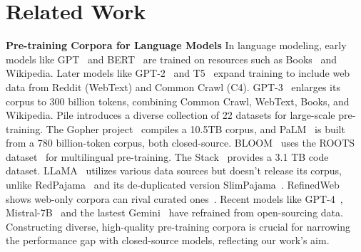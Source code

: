 \section{Related Work}

\noindent\textbf{Pre-training Corpora for Language Models} \quad In language modeling, early models like GPT~\citep{radford2018improving} and BERT~\citep{devlin-etal-2019-bert} are trained on resources such as Books~\citep{DBLP:conf/iccv/ZhuKZSUTF15-Books} and Wikipedia. Later models like GPT-2~\citep{radford2019gpt-2} and T5~\citep{DBLP:journals/jmlr/RaffelSRLNMZLL20-T5} expand training to include web data from Reddit (WebText) and Common Crawl (C4). GPT-3~\citep{DBLP:conf/nips/BrownMRSKDNSSAA20-gpt-3} enlarges its corpus to 300 billion tokens, combining Common Crawl, WebText, Books, and Wikipedia. Pile \citep{DBLP:journals/corr/abs-2101-00027-pile} introduces a diverse collection of 22 datasets for large-scale pre-training. The Gopher project~\citep{DBLP:journals/corr/abs-2112-11446-gopher} compiles a 10.5TB corpus, and PaLM~\citep{DBLP:journals/jmlr/ChowdheryNDBMRBCSGSSTMRBTSPRDHPBAI23-palm} is built from a 780 billion-token corpus, both closed-source. BLOOM~\citep{DBLP:journals/corr/abs-2211-05100-bloom} uses the ROOTS dataset~\citep{DBLP:conf/nips/LaurenconSWAMSW22-roots} for multilingual pre-training. The Stack~\citet{DBLP:journals/corr/abs-2211-15533-stack} provides a 3.1 TB code dataset. LLaMA~\citep{DBLP:journals/corr/abs-2302-13971-llama} utilizes various data sources but doesn't release its corpus, unlike RedPajama~\citep{RedPajama} and its de-duplicated version SlimPajama~\citep{SlimPajama}. RefinedWeb shows web-only corpora can rival curated ones~\citep{DBLP:journals/corr/abs-2306-01116-refinedweb}. Recent models like GPT-4~\citep{DBLP:journals/corr/abs-2303-08774-gpt-4}, Mistral-7B~\citep{DBLP:journals/corr/abs-2310-06825-mistral-7b} and the lastest Gemini~\citep{team2023gemini} have refrained from open-sourcing data. Constructing diverse, high-quality pre-training corpora is crucial for narrowing the performance gap with closed-source models, reflecting our work's aim.

